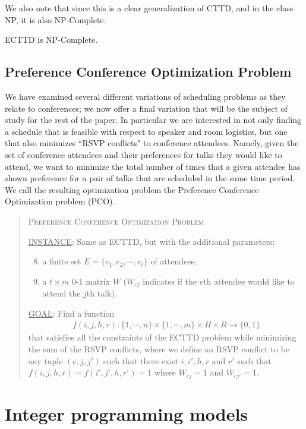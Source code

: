 \documentclass{svjour3}                     %
\begin{document}
We also note that since this is a clear generalization of CTTD, and in the class NP, it is also NP-Complete.
\begin{proposition}
	ECTTD is NP-Complete.
\end{proposition}

\subsection{Preference Conference Optimization Problem}
We have examined several different variations of scheduling problems as they relate to conferences; we now offer a final variation that will be the subject of study for the rest of the paper. 
In particular we are interested in not only finding a schedule that is feasible with respect to speaker and room logistics,  but one that also minimizes ``RSVP conflicts" to conference attendees. 
Namely, given the set of conference attendees and their preferences for talks they would like to attend, we want to minimize the total number of times that a given attendee has shown preference for a pair of talks that are scheduled in the same time period.
We call the resulting optimization problem the Preference Conference Optimization problem (PCO).
\begin{quote}
	\textsc{Preference Conference Optimization Problem}
	
	\underline{INSTANCE}: Same as ECTTD, but with the additional parameters:
	\begin{enumerate}[1.]
		\setcounter{enumi}{7}
		\item a finite set $E = \{e_1, e_2, \cdots, e_t\}$ of attendees;
		\item a $t \times m$ 0-1 matrix $W$ ($W_{ej}$ indicates if the $e$th attendee would like to attend the $j$th talk).
	\end{enumerate}
	
	\underline{GOAL}: Find a function 
	\begin{gather*}
		f(i,j,h,r) : \{1,\cdots,n\} \times \{1,\cdots,m\} \times H \times R \rightarrow \{0,1\}
	\end{gather*}
	that satisfies all the constraints of the ECTTD problem while minimizing the sum of the RSVP conflicts, where we define an RSVP conflict to be any tuple $(e,j,j')$ such that  there exist $i,i',h,r$ and $r'$ such that $f(i,j,h,r)=f(i',j',h,r')=1$ where $W_{ej}=1$ and $W_{ej'}=1$.
\end{quote}

\section{Integer programming models}\label{sec.model}
\end{document}
